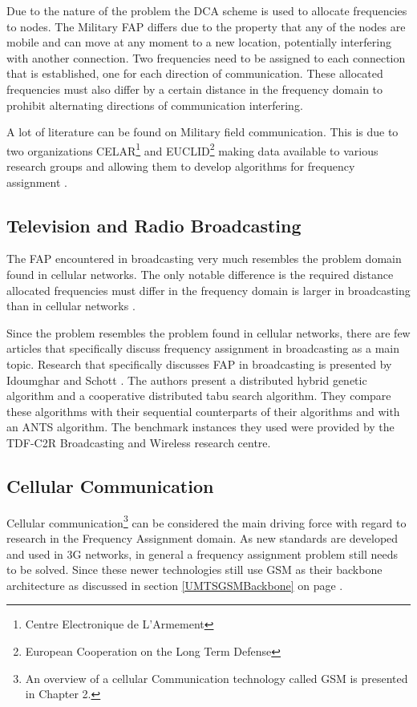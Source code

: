 Due to the nature of the problem the DCA scheme is used to allocate frequencies to nodes. The Military FAP differs due to the property that any of the nodes are mobile and can move at any moment to a new location, potentially interfering with another connection\cite{CALMA,DynamicFAP}. Two frequencies need to be assigned to each connection that is established, one for each direction of communication. These allocated frequencies must also differ by a certain distance in the frequency domain to prohibit alternating directions of communication interfering\cite{CALMA,DynamicFAP}.

A lot of literature can be found on Military field communication. This is due to two organizations CELAR\footnote{Centre Electronique de L'Armement} and EUCLID\footnote{European Cooperation on the Long Term Defense} making data available to various research groups and allowing them to develop algorithms for frequency assignment \cite{CALMA,DynamicFAP}. 

\subsection{Television and Radio Broadcasting}
The FAP encountered in broadcasting very much resembles the problem domain found in cellular networks. The only notable difference is the required distance allocated frequencies must differ in the frequency domain is larger in broadcasting than in cellular networks \cite{Karen2004}.

Since the problem resembles the problem found in cellular networks, there are few articles that specifically discuss frequency assignment in broadcasting as a main topic. Research that specifically discusses FAP in broadcasting is presented by Idoumghar and Schott \cite{RadioFAP}. The authors present a distributed hybrid genetic algorithm and a cooperative distributed tabu search algorithm. They compare these algorithms with their sequential counterparts of their algorithms and with an ANTS algorithm. The benchmark instances they used were provided by the TDF-C2R Broadcasting and Wireless research centre.
\subsection{Cellular Communication}
Cellular communication\footnote{An overview of a cellular Communication technology called GSM is presented in Chapter 2.} can be considered the main driving force with regard to research in the Frequency Assignment domain. As new standards are developed and used in 3G networks, in general a frequency assignment problem still needs to be solved. Since these newer technologies still use GSM as their backbone architecture as discussed in section \ref{UMTSGSMBackbone} on page \pageref{UMTSGSMBackbone}.

